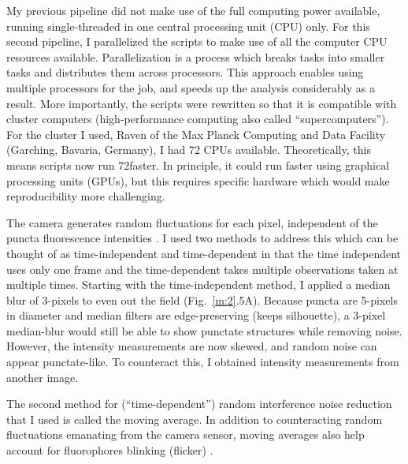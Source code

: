 My previous pipeline did not make use of the full computing power available, running single-threaded in one central processing unit (CPU) only. For this second pipeline, I parallelized the scripts to make use of all the computer CPU resources available. Parallelization is a process which breaks tasks into smaller tasks and distributes them across processors. This approach enables using multiple processors for the job, and speeds up the analysis considerably as a result. More importantly, the scripts were rewritten so that it is compatible with cluster computers (high-performance computing also called “supercomputers”). For the cluster I used, Raven of the Max Planck Computing and Data Facility (Garching, Bavaria, Germany), I had 72 CPUs available. Theoretically, this means scripts now run 72\times faster. In principle, it could run faster using graphical processing units (GPUs), but this requires specific hardware which would make reproducibility more challenging.

The camera generates random fluctuations for each pixel, independent of the puncta fluorescence intensities \autocite{Diekmann_2022}. I used two methods to address this which can be thought of as time-independent and time-dependent in that the time independent uses only one frame and the time-dependent takes multiple observations taken at multiple times. Starting with the time-independent method, I applied a median blur of 3-pixels to even out the field (Fig.~\ref{m:2}.5A). Because puncta are 5-pixels in diameter and median filters are edge-preserving (keeps silhouette), a 3-pixel median-blur would still be able to show punctate structures while removing noise. However, the intensity measurements are now skewed, and random noise can appear punctate-like. To counteract this, I obtained intensity measurements from another image.

The second method for (“time-dependent”) random interference noise reduction that I used is called the moving average. In addition to counteracting random fluctuations emanating from the camera sensor, moving averages also help account for fluorophores blinking (flicker) \autocite{Dickson_1997}.

